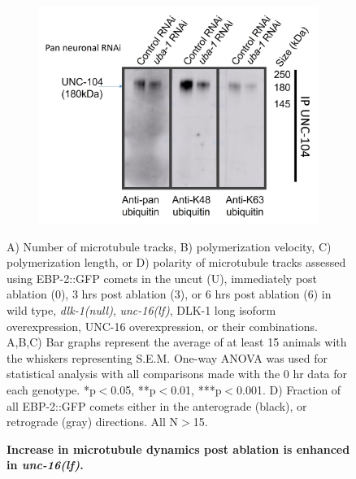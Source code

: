 \begin{appendices}
\begin{figure}[H]
\begin{minipage}[t]{0.65\textwidth}
\begin{subfigure}{1\textwidth}
		\end{subfigure}
		\begin{subfigure}{1\textwidth}
			\caption{}
			\includegraphics[width=\textwidth]{figs/example}
			
		\end{subfigure}
		
	\end{minipage}
	\begin{minipage}[t]{0.3\textwidth}
		\vspace{0pt}
		\caption[Increase in microtubule dynamics post ablation is enhanced in \textit{unc-16(lf)}.]{\textbf{Increase in microtubule dynamics post ablation is enhanced in \textit{unc-16(lf)}.}} \raggedright \small A) Number of microtubule tracks, B) polymerization velocity, C) polymerization length, or D) polarity of microtubule tracks assessed using EBP-2::GFP comets in the uncut (U), immediately post ablation (0), 3 hrs post ablation (3), or 6 hrs post ablation (6) in wild type, \textit{dlk-1(null)}, \textit{unc-16(lf)}, DLK-1 long isoform overexpression, UNC-16 overexpression, or their combinations. A,B,C) Bar graphs represent the average of at least 15 animals with the whiskers representing S.E.M. One-way ANOVA was used for statistical analysis with all comparisons made with the 0 hr data for each genotype. *p$<$0.05, **p$<$0.01, ***p$<$0.001. D) Fraction of all EBP-2::GFP comets either in the anterograde (black), or retrograde (gray) directions. All N$>$15.
		\label{fig:MTdynmut}
	\end{minipage}
	\end{figure}


\end{appendices}

